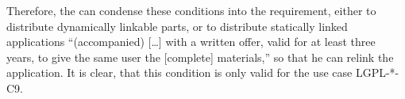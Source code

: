 \begin{itemize}
  Therefore, the \oslic{} can condense these conditions into the requirement,
  either to distribute dynamically linkable parts, or to distribute statically
  linked applications \enquote{(accompanied) [\ldots] with a written offer,
  valid for at least three years, to give the same user the [complete]
  materials,} so that he can relink the application. It is
  clear, that this condition is only valid for the use case LGPL-*-C9.
  
\end{itemize}

%


